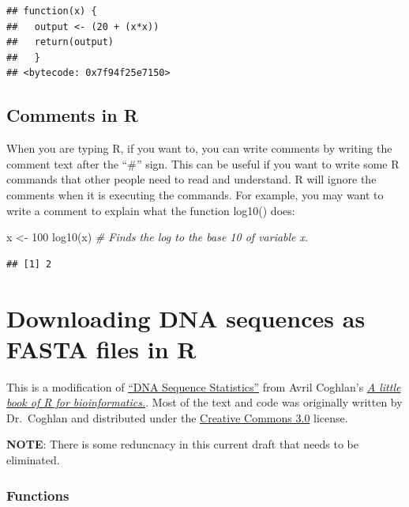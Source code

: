 \documentclass[
]{book}
\newenvironment{Shaded}{\begin{snugshade}}{\end{snugshade}}
\newcommand{\CommentTok}[1]{\textcolor[rgb]{0.56,0.35,0.01}{\textit{#1}}}
\newcommand{\DecValTok}[1]{\textcolor[rgb]{0.00,0.00,0.81}{#1}}
\newcommand{\FunctionTok}[1]{\textcolor[rgb]{0.00,0.00,0.00}{#1}}
\newcommand{\NormalTok}[1]{#1}
\newcommand{\OtherTok}[1]{\textcolor[rgb]{0.56,0.35,0.01}{#1}}
\begin{document}
\begin{verbatim}
## function(x) { 
##   output <- (20 + (x*x)) 
##   return(output)
##   }
## <bytecode: 0x7f94f25e7150>
\end{verbatim}

\hypertarget{comments-in-r}{%
\section{Comments in R}\label{comments-in-r}}

When you are typing R, if you want to, you can write comments by writing the comment text after the ``\#'' sign. This can be useful if you want to write some R commands that other people need to read and understand. R will ignore the comments when it is executing the commands. For example, you may want to write a comment to explain what the function log10() does:

\begin{Shaded}
\begin{Highlighting}[]
\NormalTok{x }\OtherTok{\textless{}{-}} \DecValTok{100}
\FunctionTok{log10}\NormalTok{(x) }\CommentTok{\# Finds the log to the base 10 of variable x.}
\end{Highlighting}
\end{Shaded}

\begin{verbatim}
## [1] 2
\end{verbatim}

\hypertarget{downloading-dna-sequences-as-fasta-files-in-r}{%
\chapter{Downloading DNA sequences as FASTA files in R}\label{downloading-dna-sequences-as-fasta-files-in-r}}

This is a modification of \href{https://a-little-book-of-r-for-bioinformatics.readthedocs.io/en/latest/src/chapter1.html}{``DNA Sequence Statistics''} from Avril Coghlan's \href{https://a-little-book-of-r-for-bioinformatics.readthedocs.io/en/latest/index.html}{\emph{A little book of R for bioinformatics.}}. Most of the text and code was originally written by Dr.~Coghlan and distributed under the \href{https://creativecommons.org/licenses/by/3.0/us/}{Creative Commons 3.0} license.

\textbf{NOTE}: There is some reduncnacy in this current draft that needs to be eliminated.

\hypertarget{functions-4}{%
\subsection{Functions}\label{functions-4}}
\end{document}
